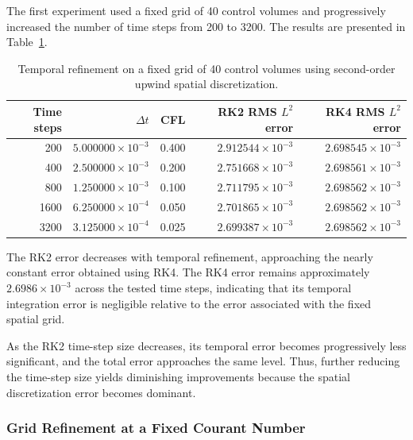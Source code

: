 The first experiment used a fixed grid of 40 control volumes and progressively increased the number of time steps from 200 to 3200. The results are presented in Table~\ref{tab:temporal-refinement-fixed-grid}.

\begin{table}[!htbp]
    \centering
    \caption{Temporal refinement on a fixed grid of 40 control volumes using second-order upwind spatial discretization.}
    \label{tab:temporal-refinement-fixed-grid}
    \footnotesize
    \setlength{\tabcolsep}{4pt}
    \begin{tabular}{r r r r r}
        \toprule
        Time steps & $\Delta t$ & CFL & \shortstack{RK2 RMS \\$L^2$ error} & \shortstack{RK4 RMS \\$L^2$ error} \\
        \midrule
        200  & $5.000000\times10^{-3}$ & 0.400 & $2.912544\times10^{-3}$ & $2.698545\times10^{-3}$ \\
        400  & $2.500000\times10^{-3}$ & 0.200 & $2.751668\times10^{-3}$ & $2.698561\times10^{-3}$ \\
        800  & $1.250000\times10^{-3}$ & 0.100 & $2.711795\times10^{-3}$ & $2.698562\times10^{-3}$ \\
        1600 & $6.250000\times10^{-4}$ & 0.050 & $2.701865\times10^{-3}$ & $2.698562\times10^{-3}$ \\
        3200 & $3.125000\times10^{-4}$ & 0.025 & $2.699387\times10^{-3}$ & $2.698562\times10^{-3}$ \\
        \bottomrule
    \end{tabular}
\end{table}

The RK2 error decreases with temporal refinement, approaching the nearly constant error obtained using RK4. The RK4 error remains approximately $2.6986\times10^{-3}$ across the tested time steps, indicating that its temporal integration error is negligible relative to the error associated with the fixed spatial grid.

As the RK2 time-step size decreases, its temporal error becomes progressively less significant, and the total error approaches the same level. Thus, further reducing the time-step size yields diminishing improvements because the spatial discretization error becomes dominant.

\subsubsection{Grid Refinement at a Fixed Courant Number}
\label{subsubsec:grid-refinement-fixed-cfl}

